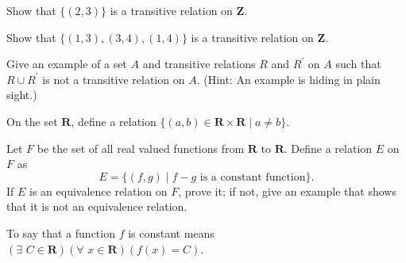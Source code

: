 \documentclass[12pt,fleqn,answers]{exam}
\newcommand{\reals}{\mathbf{R}}
\newcommand{\integers}{\mathbf{Z}}
\begin{document}
\begin{questions} 

\question [1] Show that $\{(2,3)\}$ is a transitive relation on $\integers$.


\question [1] Show that $\{(1,3), (3,4), (1,4)\}$ is a transitive relation on $\integers$.

\question [1] Give an example of a set $A$ and transitive relations
$R$ and $R^\prime$ on $A$ such that $R \cup R^\prime$ is not 
a transitive relation on $A$. (Hint: An example is hiding in plain sight.)

\question On the set $\reals$, define a relation $\{(a,b) \in \reals \times \reals \mid a \neq b \}$.


\question [1] Let $F$ be the set of all real valued functions from $\reals$ to 
$\reals$. Define a relation $E$ on $F$ as 
\begin{equation*}
    E = \{(f,g) \mid f - g \mbox{ is a constant function} \}.
\end{equation*}
If $E$ is an equivalence relation on $F$, prove it; if not, 
give an example that shows that it is not an equivalence relation.

To say that a function $f$ is constant means
\(
     \left(\exists \,\,  C \in \reals \right)
     \left(\forall \,\, x \in \reals \right)
     \left(f(x) = C \right)
\).

\end{questions}
\end{document}
